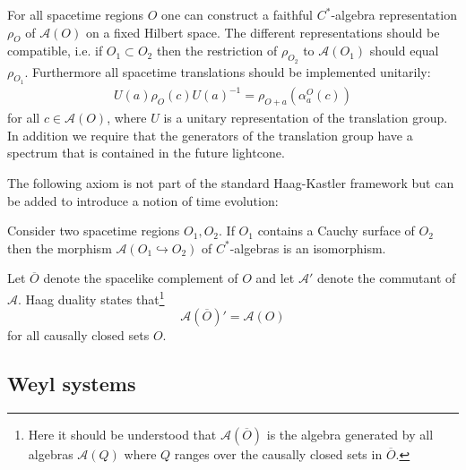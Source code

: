 	\begin{axiom}[Spectrum]
		For all spacetime regions $O$ one can construct a faithful $C^*$-algebra representation $\rho_O$ of $\mathcal{A}(O)$ on a fixed Hilbert space. The different representations should be compatible, i.e. if $O_1\subset O_2$ then the restriction of $\rho_{O_2}$ to $\mathcal{A}(O_1)$ should equal $\rho_{O_1}$. Furthermore all spacetime translations should be implemented unitarily:
		\begin{gather}
			U(a)\rho_O(c)U(a)^{-1} = \rho_{O+a}(\alpha^O_a(c))
		\end{gather}
		for all $c\in\mathcal{A}(O)$, where $U$ is a unitary representation of the translation group. In addition we require that the generators of the translation group have a spectrum that is contained in the future lightcone.
	\end{axiom}
	
	The following axiom is not part of the standard Haag-Kastler framework but can be added to introduce a notion of time evolution:
	\begin{axiom}
		Consider two spacetime regions $O_1, O_2$. If $O_1$ contains a Cauchy surface of $O_2$ then the morphism $\mathcal{A}(O_1\hookrightarrow O_2)$ of $C^*$-algebras is an isomorphism.
	\end{axiom}
	
	\begin{axiom}
		Let $\overline{O}$ denote the spacelike complement of $O$ and let $\mathcal{A}'$ denote the commutant of $\mathcal{A}$. Haag duality states that\footnote{Here it should be understood that $\mathcal{A}\left(\overline{O}\right)$ is the algebra generated by all algebras $\mathcal{A}(Q)$ where $Q$ ranges over the causally closed sets in $\overline{O}$.}
		\begin{equation}
			\mathcal{A}\left(\overline{O}\right)' = \mathcal{A}(O)
		\end{equation}
		for all causally closed sets $O$.
	\end{axiom}
	
\subsection{Weyl systems}

	

